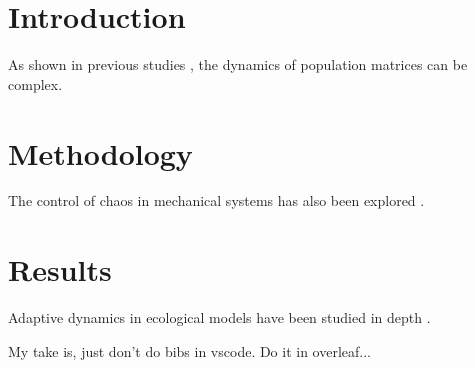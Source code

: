 \documentclass{article}
\begin{document}
\section{Introduction}
As shown in previous studies \cite{Caceres2010, Namba1989}, the dynamics of population matrices can be complex.

\section{Methodology}
The control of chaos in mechanical systems has also been explored \cite{Garcia2007}.

\section{Results}
Adaptive dynamics in ecological models have been studied in depth \cite{Metz2004}.



My take is, just don't do bibs in vscode. Do it in overleaf... 
\end{document}
